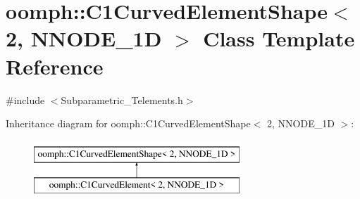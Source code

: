 \hypertarget{classoomph_1_1C1CurvedElementShape_3_012_00_01NNODE__1D_01_4}{}\section{oomph\+:\+:C1\+Curved\+Element\+Shape$<$ 2, N\+N\+O\+D\+E\+\_\+1D $>$ Class Template Reference}
\label{classoomph_1_1C1CurvedElementShape_3_012_00_01NNODE__1D_01_4}


{\ttfamily \#include $<$Subparametric\+\_\+\+Telements.\+h$>$}

Inheritance diagram for oomph\+:\+:C1\+Curved\+Element\+Shape$<$ 2, N\+N\+O\+D\+E\+\_\+1D $>$\+:\begin{figure}[H]
\begin{center}
\leavevmode
\includegraphics[height=2.000000cm]{classoomph_1_1C1CurvedElementShape_3_012_00_01NNODE__1D_01_4}
\end{center}
\end{figure}
